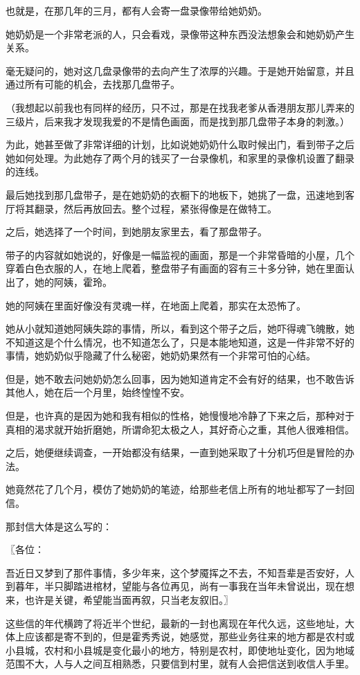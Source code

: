 也就是，在那几年的三月，都有人会寄一盘录像带给她奶奶。

她奶奶是一个非常老派的人，只会看戏，录像带这种东西没法想象会和她奶奶产生关系。

毫无疑问的，她对这几盘录像带的去向产生了浓厚的兴趣。于是她开始留意，并且通过所有可能的机会，去找那几盘带子。

（我想起以前我也有同样的经历，只不过，那是在找我老爹从香港朋友那儿弄来的三级片，后来我才发现我爱的不是情色画面，而是找到那几盘带子本身的刺激。）

为此，她甚至做了非常详细的计划，比如说她奶奶什么取时候出门，看到带子之后她如何处理。为此她存了两个月的钱买了一台录像机，和家里的录像机设置了翻录的连线。

最后她找到那几盘带子，是在她奶奶的衣橱下的地板下，她挑了一盘，迅速地到客厅将其翻录，然后再放回去。整个过程，紧张得像是在做特工。

之后，她选择了一个时间，到她朋友家里去，看了那盘带子。

带子的内容就如她说的，好像是一幅监视的画面，那是一个非常昏暗的小屋，几个穿着白色衣服的人，在地上爬着，整盘带子有画面的容有三十多分钟，她在里面认出了，她的阿姨，霍玲。

她的阿姨在里面好像没有灵魂一样，在地面上爬着，那实在太恐怖了。

她从小就知道她阿姨失踪的事情，所以，看到这个带子之后，她吓得魂飞魄散，她不知道这是个什么情况，也不知道怎么了，只是本能地知道，这是一件非常不好的事情，她奶奶似乎隐藏了什么秘密，她奶奶果然有一个非常可怕的心结。

但是，她不敢去问她奶奶怎么回事，因为她知道肯定不会有好的结果，也不敢告诉其他人，她在后一个月里，始终惶惶不安。

但是，也许真的是因为她和我有相似的性格，她慢慢地冷静了下来之后，那种对于真相的渴求就开始折磨她，所谓命犯太极之人，其好奇心之重，其他人很难相信。

之后，她便继续调查，一开始都没有结果，一直到她采取了十分机巧但是冒险的办法。

她竟然花了几个月，模仿了她奶奶的笔迹，给那些老信上所有的地址都写了一封回信。

那封信大体是这么写的：

〖各位：

吾近日又梦到了那件事情，多少年来，这个梦魇挥之不去，不知吾辈是否安好，人到暮年，半只脚踏进棺材，望能与各位再见，尚有一事我在当年未曾说出，现在想来，也许是关键，希望能当面再叙，只当老友叙旧。〗

这些信的年代横跨了将近半个世纪，最新的一封也离现在年代久远，这些地址，大体上应该都是寄不到的，但是霍秀秀说，她感觉，那些业务往来的地方都是农村或小县城，农村和小县城是变化最小的地方，特别是农村，即使地址变化，因为地域范围不大，人与人之间互相熟悉，只要信到村里，就有人会把信送到收信人手里。


